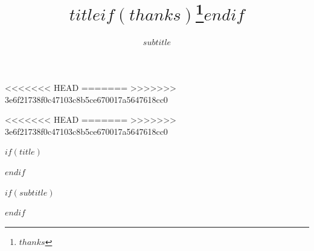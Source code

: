 \providecommand{\OrcidIconFile}{orcid.png}   %
\providecommand{\OrcidIconHeight}{1.2ex}     %
<<<<<<< HEAD
\providecommand{\OrcidIconRaise}{0.5ex}     %
=======
\providecommand{\OrcidIconRaise}{0.5ex}      %
\providecommand{\OrcidIconKern}{-0.05em}     %
\providecommand{\AffilidKern}{-0.25em}       %
>>>>>>> 3e6f21738f0c47103c8b5ce670017a5647618cc0

\providecommand{\AffilMarkSize}{\scriptsize} %

\providecommand{\EmailIconSize}{\scriptsize} %
\providecommand{\EmailIconRaise}{-0.5ex}     %
<<<<<<< HEAD
\providecommand{\EmailIconKern}{0.5em}      %
=======
\providecommand{\EmailIconKern}{0.05em}      %
>>>>>>> 3e6f21738f0c47103c8b5ce670017a5647618cc0

$if(title)$
\title{$title$$if(thanks)$\thanks{$thanks$}$endif$}
$endif$

$if(subtitle)$
\subtitle{$subtitle$}
$endif$

